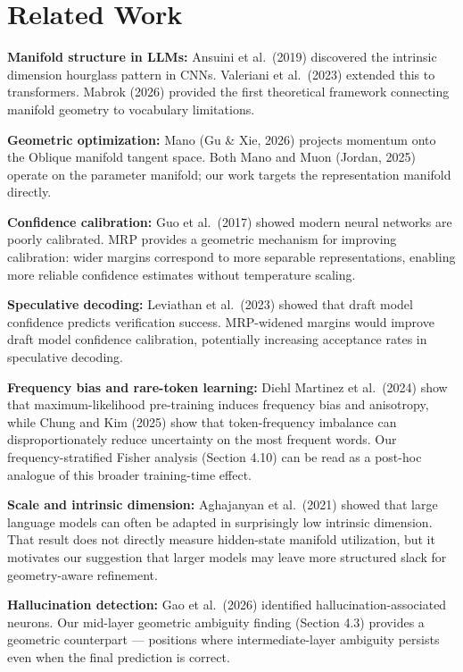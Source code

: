 \documentclass[
  11pt,
]{article}
\begin{document}
\hypertarget{related-work}{%
\section{Related Work}\label{related-work}}

\textbf{Manifold structure in LLMs:} Ansuini et al.~(2019) discovered
the intrinsic dimension hourglass pattern in CNNs. Valeriani et
al.~(2023) extended this to transformers. Mabrok (2026) provided the
first theoretical framework connecting manifold geometry to vocabulary
limitations.

\textbf{Geometric optimization:} Mano (Gu \& Xie, 2026) projects
momentum onto the Oblique manifold tangent space. Both Mano and Muon
(Jordan, 2025) operate on the parameter manifold; our work targets the
representation manifold directly.

\textbf{Confidence calibration:} Guo et al.~(2017) showed modern neural
networks are poorly calibrated. MRP provides a geometric mechanism for
improving calibration: wider margins correspond to more separable
representations, enabling more reliable confidence estimates without
temperature scaling.

\textbf{Speculative decoding:} Leviathan et al.~(2023) showed that draft
model confidence predicts verification success. MRP-widened margins
would improve draft model confidence calibration, potentially increasing
acceptance rates in speculative decoding.

\textbf{Frequency bias and rare-token learning:} Diehl Martinez et
al.~(2024) show that maximum-likelihood pre-training induces frequency
bias and anisotropy, while Chung and Kim (2025) show that
token-frequency imbalance can disproportionately reduce uncertainty on
the most frequent words. Our frequency-stratified Fisher analysis
(Section 4.10) can be read as a post-hoc analogue of this broader
training-time effect.

\textbf{Scale and intrinsic dimension:} Aghajanyan et al.~(2021) showed
that large language models can often be adapted in surprisingly low
intrinsic dimension. That result does not directly measure hidden-state
manifold utilization, but it motivates our suggestion that larger models
may leave more structured slack for geometry-aware refinement.

\textbf{Hallucination detection:} Gao et al.~(2026) identified
hallucination-associated neurons. Our mid-layer geometric ambiguity
finding (Section 4.3) provides a geometric counterpart --- positions
where intermediate-layer ambiguity persists even when the final
prediction is correct.
\end{document}
